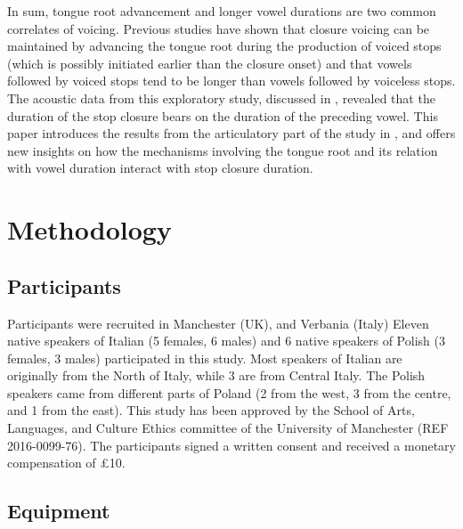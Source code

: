 \documentclass[12pt,]{article}
\begin{document}
In sum, tongue root advancement and longer vowel durations are two
common correlates of voicing. Previous studies have shown that closure
voicing can be maintained by advancing the tongue root during the
production of voiced stops (which is possibly initiated earlier than the
closure onset) and that vowels followed by voiced stops tend to be
longer than vowels followed by voiceless stops. The acoustic data from
this exploratory study, discussed in \citet{coretta2018j}, revealed that
the duration of the stop closure bears on the duration of the preceding
vowel. This paper introduces the results from the articulatory part of
the study in \citet{coretta2018j}, and offers new insights on how the
mechanisms involving the tongue root and its relation with vowel
duration interact with stop closure duration.

\hypertarget{methodology}{%
\section{Methodology}\label{methodology}}

\hypertarget{participants}{%
\subsection{Participants}\label{participants}}

Participants were recruited in Manchester (UK), and Verbania (Italy)
Eleven native speakers of Italian (5 females, 6 males) and 6 native
speakers of Polish (3 females, 3 males) participated in this study. Most
speakers of Italian are originally from the North of Italy, while 3 are
from Central Italy. The Polish speakers came from different parts of
Poland (2 from the west, 3 from the centre, and 1 from the east). This
study has been approved by the School of Arts, Languages, and Culture
Ethics committee of the University of Manchester (REF 2016-0099-76). The
participants signed a written consent and received a monetary
compensation of £10.

\hypertarget{equipment}{%
\subsection{Equipment}\label{equipment}}

\label{s:equipment}
\end{document}
